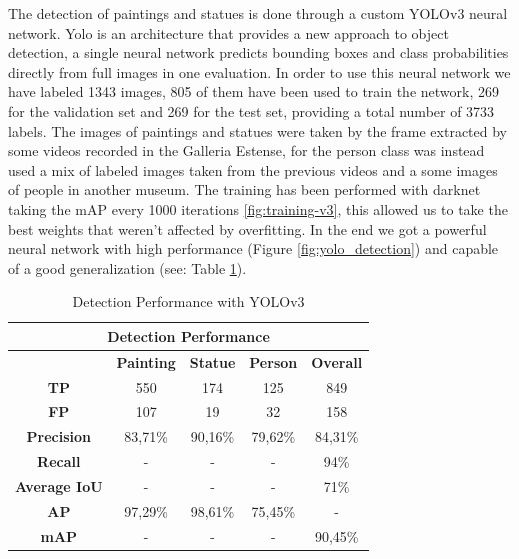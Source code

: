 The detection of paintings and statues is done through a custom YOLOv3 neural network.\cite{yolov3}
Yolo is an architecture that provides a new approach to object detection, a single neural network predicts bounding boxes and class probabilities directly from full images in one evaluation.
In order to use this neural network we have labeled 1343 images, 805 of them have been used to train the network, 269 for the validation set and 269 for the test set, providing a total number of 3733 labels. The images of paintings and statues were taken by the frame extracted by some videos recorded in the Galleria Estense, for the person class was instead used a mix of labeled images taken from the previous videos and a some images of people in another museum.
The training has been performed with darknet \cite{darknet} taking the mAP every 1000 iterations \ref{fig:training-v3}, this allowed us to take the best weights that weren't affected by overfitting.
In the end we got a powerful neural network with high performance (Figure \ref{fig:yolo_detection}) and capable of a good generalization (see: Table \ref{tab:detection_performance}).



\begin{table}[ht]
    \centering
\begin{tabular}{|c|c|c|c|c|}
\hline
\multicolumn{5}{|c|}{\textbf{Detection Performance}}       \\ \hline
\multicolumn{1}{|l|}{} & \textbf{Painting} & \textbf{Statue} & \textbf{Person} & \textbf{Overall} \\ \hline
\textbf{TP}        & 550     & 174     & 125     & 849     \\ \hline
\textbf{FP}        & 107     & 19      & 32      & 158     \\ \hline
\textbf{Precision} & 83,71\% & 90,16\% & 79,62\% & 84,31\% \\ \hline
\textbf{Recall}    & -       & -       & -       & 94\%    \\ \hline
\textbf{Average IoU}       & -       & -       & -       & 71\%    \\ \hline
\textbf{AP}        & 97,29\% & 98,61\% & 75,45\% & -       \\ \hline
\textbf{mAP}       & -       & -       & -       & 90,45\% \\ \hline
\end{tabular}
\caption{Detection Performance with YOLOv3} 
    \label{tab:detection_performance}
\end{table}



